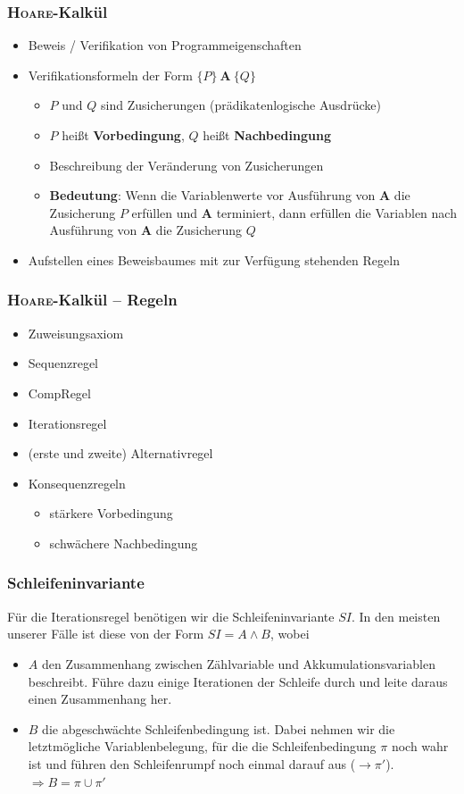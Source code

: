 \documentclass{beamer}
\renewcommand{\emph}[1]{\textbf{#1}}
\begin{document}
\begin{frame} \frametitle{\textsc{Hoare}-Kalkül}
	\begin{itemize}
		\item Beweis / Verifikation von Programmeigenschaften \pause 
		\item Verifikationsformeln der Form $\{P\} \ \mathbf{A} \ \{Q\}$
		\begin{itemize}
			\item $P$ und $Q$ sind Zusicherungen (prädikatenlogische Ausdrücke)
			\item $P$ heißt \emph{Vorbedingung}, $Q$ heißt \emph{Nachbedingung}
			\item Beschreibung der Veränderung von Zusicherungen \pause
			\item \emph{Bedeutung}: Wenn die Variablenwerte vor Ausführung von $\mathbf{A}$ die Zusicherung $P$ erfüllen und $\mathbf{A}$ terminiert, dann erfüllen die Variablen nach Ausführung von $\mathbf{A}$ die Zusicherung $Q$
		\end{itemize} \pause
		\item Aufstellen eines Beweisbaumes mit zur Verfügung stehenden Regeln
	\end{itemize}
\end{frame}


\begin{frame} \frametitle{\textsc{Hoare}-Kalkül -- Regeln}
	\begin{itemize}
		\item Zuweisungsaxiom
		\item Sequenzregel
		\item CompRegel
		\item Iterationsregel
		\item (erste und zweite) Alternativregel
		\item Konsequenzregeln
		\begin{itemize}
			\item stärkere Vorbedingung
			\item schwächere Nachbedingung
		\end{itemize}
	\end{itemize}
\end{frame}

\begin{frame} \frametitle{Schleifeninvariante}
	Für die Iterationsregel benötigen wir die Schleifeninvariante $SI$.
	In den meisten unserer Fälle ist diese von der Form $SI = A \land B$, wobei
	\begin{itemize}
		\item $A$ den Zusammenhang zwischen Zählvariable und Akkumulationsvariablen beschreibt. Führe dazu einige Iterationen der Schleife durch und leite daraus einen Zusammenhang her.
		\item $B$ die abgeschwächte Schleifenbedingung ist. Dabei nehmen wir die letztmögliche Variablenbelegung, für die die Schleifenbedingung $\pi$ noch wahr ist und führen den Schleifenrumpf noch einmal darauf aus ($\to \pi'$). \\
		$\Rightarrow B = \pi \cup \pi'$
	\end{itemize}
\end{frame}
\end{document}
